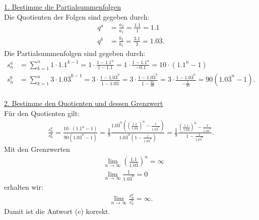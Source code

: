 \underline{1. Bestimme die Partialsummenfolgen}\\
Die Quotienten der Folgen sind gegeben durch:
\begin{align*}
	q^a &= \frac{a_2}{a_1} = \frac{1.1}{1} = 1.1\\
	q^b &= \frac{b_2}{b_1} = \frac{3.1}{3} = 1.0\overline{3}.
\end{align*}
Die Partialsummenfolgen sind gegeben durch:
\begin{align*}
	s_n^a
	&=
	\sum \limits_{k=1}^n 1 \cdot 1.1^{k-1}
	=
	1 \cdot 
	\frac{1 -1.1^n}{1 - 1.1}
	= 
	1 \cdot 
	\frac{1 - 1.1^n}{-0.1}
	=
	10 \cdot( 1.1^n - 1)\\
	s_n^b
	&=
	\sum \limits_{k=1}^n 3 \cdot 1.0\overline{3}^{k-1}
	=
	3 \cdot 
	\frac{1 -1.0\overline{3}^n}{1 - 1.0\overline{3}}
	= 
		3 \cdot 
	\frac{1 - 1.0\overline{3}^n}{1 - \frac{31}{30}}
	=
	3 \cdot 
	\frac{1 - 1.0\overline{3}^n}{- \frac{1}{30}}
	=
	90 (1.0\overline{3}^n -1).
\end{align*}
\ \\
\underline{2. Bestimme den Quotienten und dessen Grenzwert}\\
Für den Quotienten gilt:
\begin{align*}
	\frac{s_n^a}{s_n^b}
	=
	\frac{10 \cdot( 1.1^n - 1)}{90 (1.0\overline{3}^n -1)}
	=
	\frac{1}{9}
		\frac{
			1.0\overline{3}^n 
			\left(
			\left(
				\frac{1.1}{1.0\overline{3}}
				\right)^n 
				- \frac{1}{1.0\overline{3}^n}
			\right)
		}
		{
			1.0\overline{3}^n 
				\left(
					1 - 	\frac{1}{1.0\overline{3}^n}
				\right)		
		}
	=
	\frac{1}{9}
	\frac{	
		\left(
		\frac{1.1}{1.0\overline{3}}
		\right)^n 
		- \frac{1}{1.0\overline{3}^n}
	}
	{
		1 - 	\frac{1}{1.0\overline{3}^n}	
	}.
\end{align*}
Mit den Grenzwerten
\begin{align*}
	&\lim 
	\limits_{n \to \infty}
	\left(\frac{1.1}{1.0\overline{3}}\right)^n = \infty\\
	&\lim 
	\limits_{n \to \infty}
	\frac{1}{1.0\overline{3}^n} = 0
\end{align*}
erhalten wir:
\begin{align*}
	\lim 
	\limits_{n \to \infty}
	\frac{s_n^a}{s_n^b} = \infty.
\end{align*}
Damit ist die Antwort (c) korrekt.

\newpage
